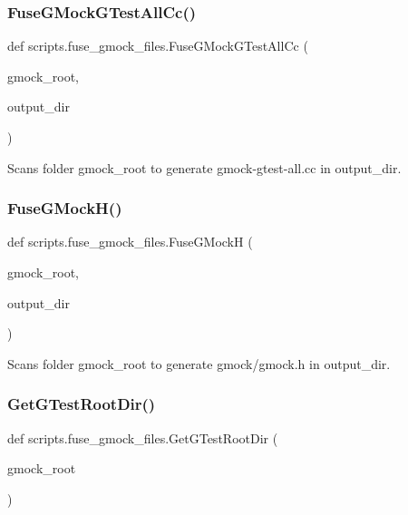 \subsubsection{\texorpdfstring{FuseGMockGTestAllCc()}{FuseGMockGTestAllCc()}}
{\footnotesize\ttfamily def scripts.\+fuse\+\_\+gmock\+\_\+files.\+Fuse\+G\+Mock\+G\+Test\+All\+Cc (\begin{DoxyParamCaption}\item[{}]{gmock\+\_\+root,  }\item[{}]{output\+\_\+dir }\end{DoxyParamCaption})}

\begin{DoxyVerb}Scans folder gmock_root to generate gmock-gtest-all.cc in output_dir.\end{DoxyVerb}
 \mbox{\label{namespacescripts_1_1fuse__gmock__files_adf0e7c53849e827c73b1d594fcbcd2b4}} 
\subsubsection{\texorpdfstring{FuseGMockH()}{FuseGMockH()}}
{\footnotesize\ttfamily def scripts.\+fuse\+\_\+gmock\+\_\+files.\+Fuse\+G\+MockH (\begin{DoxyParamCaption}\item[{}]{gmock\+\_\+root,  }\item[{}]{output\+\_\+dir }\end{DoxyParamCaption})}

\begin{DoxyVerb}Scans folder gmock_root to generate gmock/gmock.h in output_dir.\end{DoxyVerb}
 \mbox{\label{namespacescripts_1_1fuse__gmock__files_aaec9da71b23f7103fdd3d03379ed9ab5}} 
\subsubsection{\texorpdfstring{GetGTestRootDir()}{GetGTestRootDir()}}
{\footnotesize\ttfamily def scripts.\+fuse\+\_\+gmock\+\_\+files.\+Get\+G\+Test\+Root\+Dir (\begin{DoxyParamCaption}\item[{}]{gmock\+\_\+root }\end{DoxyParamCaption})}

